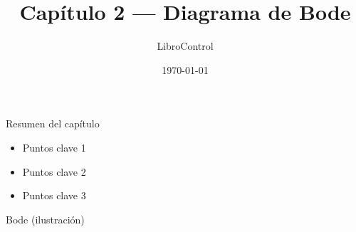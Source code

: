 \documentclass{beamer}
\title{Capítulo 2 — Diagrama de Bode}
\author{LibroControl}
\date{\today}
\begin{document}
\begin{frame}
  \titlepage
\end{frame}

\begin{frame}{Resumen del capítulo}
  \begin{itemize}
    \item Puntos clave 1
    \item Puntos clave 2
    \item Puntos clave 3
  \end{itemize}
\end{frame}

\begin{frame}{Bode (ilustración)}
  \centering
\end{frame}
\end{document}
